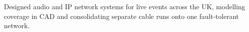 Designed audio and IP network systems for live events across the UK, modelling coverage in CAD and consolidating separate cable runs onto one fault-tolerant network.
\sectionsep{}

